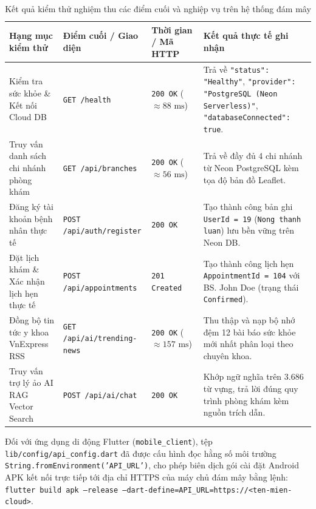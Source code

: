 \begin{table}[H]
\caption{Kết quả kiểm thử nghiệm thu các điểm cuối và nghiệp vụ trên hệ thống đám mây}
\label{tab:cloud_verification_results}
\centering
\begin{tabular}{|p{3.8cm}|p{3.0cm}|p{2.2cm}|p{5.0cm}|}
\hline
\textbf{Hạng mục kiểm thử} & \textbf{Điểm cuối / Giao diện} & \textbf{Thời gian / Mã HTTP} & \textbf{Kết quả thực tế ghi nhận} \\
\hline
Kiểm tra sức khỏe \& Kết nối Cloud DB & \texttt{GET /health} & \texttt{200 OK} ($\approx 88\text{ ms}$) & Trả về \texttt{"status": "Healthy"}, \texttt{"provider": "PostgreSQL (Neon Serverless)"}, \texttt{"databaseConnected": true}. \\
\hline
Truy vấn danh sách chi nhánh phòng khám & \texttt{GET /api/branches} & \texttt{200 OK} ($\approx 56\text{ ms}$) & Trả về đầy đủ 4 chi nhánh từ Neon PostgreSQL kèm tọa độ bản đồ Leaflet. \\
\hline
Đăng ký tài khoản bệnh nhân thực tế & \texttt{POST /api/auth/register} & \texttt{200 OK} & Tạo thành công bản ghi \texttt{UserId = 19} (\texttt{Nong thanh luan}) lưu bền vững trên Neon DB. \\
\hline
Đặt lịch khám \& Xác nhận lịch hẹn thực tế & \texttt{POST /api/appointments} & \texttt{201 Created} & Tạo thành công lịch hẹn \texttt{AppointmentId = 104} với BS. John Doe (trạng thái \texttt{Confirmed}). \\
\hline
Đồng bộ tin tức y khoa VnExpress RSS & \texttt{GET /api/ai/trending-news} & \texttt{200 OK} ($\approx 157\text{ ms}$) & Thu thập và nạp bộ nhớ đệm 12 bài báo sức khỏe mới nhất phân loại theo chuyên khoa. \\
\hline
Truy vấn trợ lý ảo AI RAG Vector Search & \texttt{POST /api/ai/chat} & \texttt{200 OK} & Khớp ngữ nghĩa trên 3.686 từ vựng, trả lời đúng quy trình phòng khám kèm nguồn trích dẫn. \\
\hline
\end{tabular}
\end{table}

Đối với ứng dụng di động Flutter (\texttt{mobile\_client}), tệp \texttt{lib/config/api\_config.dart} đã được cấu hình đọc hằng số môi trường \texttt{String.fromEnvironment('API\_URL')}, cho phép biên dịch gói cài đặt Android APK kết nối trực tiếp tới địa chỉ HTTPS của máy chủ đám mây bằng lệnh: \texttt{flutter build apk --release --dart-define=API\_URL=https://<ten-mien-cloud>}.
